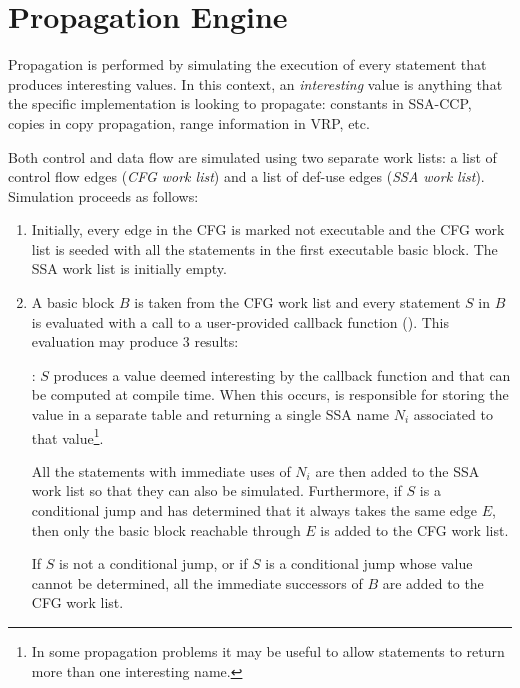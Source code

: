 \section{Propagation Engine}
\label{novillo:sec:prop-engine}

Propagation is performed by simulating the execution of every
statement that produces interesting values.  In this context, an
\textit{interesting} value is anything that the specific
implementation is looking to propagate: constants in SSA-CCP,
copies in copy propagation, range information in VRP, etc.

Both control and data flow are simulated using two separate work
lists: a list of control flow edges (\textit{CFG work list}) and a
list of def-use edges (\textit{SSA work list}).  Simulation proceeds as
follows:

\begin{enumerate}
\item	Initially, every edge in the CFG is marked not executable
	and the CFG work list is seeded with all the statements in
	the first executable basic block.  The SSA work list is
	initially empty.

\item	\label{novillo:prop-return-value}A basic block $B$ is
	taken from the CFG work list and every statement $S$ in
	$B$ is evaluated with a call to a user-provided callback
	function ().  This evaluation
	may produce 3 results:

	: $S$ produces a
	value deemed interesting by the callback function and
	that can be computed at compile time.  When this occurs,
	 is responsible for
	storing the value in a separate table and returning a
	single SSA name $N_i$ associated to that
	value\footnote{In some propagation problems it may be
	useful to allow statements to return more than one
	interesting name.}.

	All the statements with immediate uses of $N_i$ are then
	added to the SSA work list so that they can also be
	simulated.  Furthermore, if $S$ is a conditional jump and
	 has determined that it
	always takes the same edge $E$, then only the basic block
	reachable through $E$ is added to the CFG work list.

	If $S$ is not a conditional jump, or if $S$ is a
	conditional jump whose value cannot be determined, all
	the immediate successors of $B$ are added to the CFG
	work list.


\end{enumerate}
